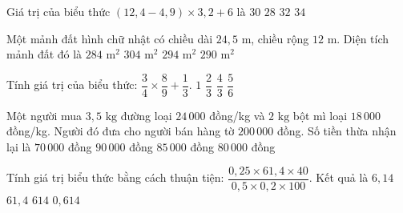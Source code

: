 \begin{ex} %
Giá trị của biểu thức $(12{,}4 - 4{,}9) \times 3{,}2 + 6$ là
\choice
{\True $30$}
{$28$}
{$32$}
{$34$}
\end{ex}

\begin{ex} %
Một mảnh đất hình chữ nhật có chiều dài $24{,}5\text{ m}$, chiều rộng $12\text{ m}$. Diện tích mảnh đất đó là
\choice
{$284\text{ m}^2$}
{$304\text{ m}^2$}
{\True $294\text{ m}^2$}
{$290\text{ m}^2$}
\end{ex}

\begin{ex} %
Tính giá trị của biểu thức: $\dfrac{3}{4} \times \dfrac{8}{9} + \dfrac{1}{3}$.
\choice
{\True $1$}
{$\dfrac{2}{3}$}
{$\dfrac{4}{3}$}
{$\dfrac{5}{6}$}
\end{ex}

\begin{ex} %
Một người mua $3{,}5\text{ kg}$ đường loại $24\,000$ đồng/kg và $2\text{ kg}$ bột mì loại $18\,000$ đồng/kg. Người đó đưa cho người bán hàng tờ $200\,000$ đồng. Số tiền thừa nhận lại là
\choice
{$70\,000$ đồng}
{$90\,000$ đồng}
{$85\,000$ đồng}
{\True $80\,000$ đồng}
\end{ex}

\begin{ex} %
Tính giá trị biểu thức bằng cách thuận tiện: $\dfrac{0{,}25 \times 61{,}4 \times 40}{0{,}5 \times 0{,}2 \times 100}$. Kết quả là
\choice
{$6{,}14$}
{\True $61{,}4$}
{$614$}
{$0{,}614$}
\end{ex}

